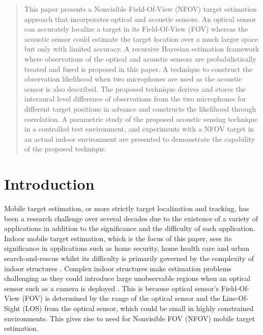 \begin{abstract}
This paper presents a Nonvisible Field-Of-View (NFOV) target estimation approach that incorporates optical and acoustic sensors.  An optical sensor can accurately localize a target in its Field-Of-View (FOV) whereas the acoustic sensor could estimate the target location over a much larger space but only with limited accuracy.  A recursive Bayesian estimation framework where observations of the optical and acoustic sensors are probabilistically treated and fused is proposed in this paper. A technique to construct the observation likelihood when two microphones are used as the acoustic sensor is also described.  The proposed technique derives and stores the interaural level difference of observations from the two microphones for different target positions in advance and constructs the likelihood through correlation.  A parametric study of the proposed acoustic sensing technique in a controlled test environment, and experiments with a NFOV target in an actual indoor environment are presented to demonstrate the capability of the proposed technique.  

\end{abstract}

\section{Introduction}
\label{intro} 
Mobile target estimation, or more strictly target localization and tracking, has been a research challenge over several decades due to the existence of a variety of applications in addition to the significance and the difficulty of each application.  Indoor mobile target estimation, which is the focus of this paper, sees its significance in applications such as home security, home health care and urban search-and-rescue whilst its difficulty is primarily governed by the complexity of indoor structures \cite{Bahl2000,Khoury2009}.  Complex indoor structures make estimation problems challenging as they could introduce large unobservable regions when an optical sensor such as a camera is deployed \cite{ledwich04}.  This is because optical sensor's Field-Of-View (FOV) is determined by the range of the optical sensor and the Line-Of-Sight (LOS) from the optical sensor, which could be small in highly constrained environments.  This gives rise to need for Nonvisible FOV (NFOV) mobile target estimation. 
 
